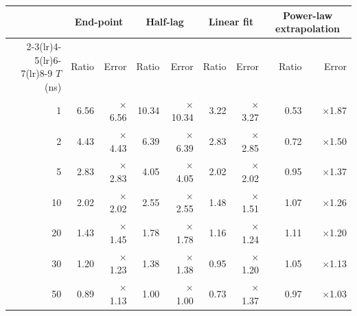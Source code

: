 \begin{tabular}{rrrrrrrrr}
\toprule
 & \multicolumn{2}{c}{End-point} & \multicolumn{2}{c}{Half-lag} & \multicolumn{2}{c}{Linear fit} & \multicolumn{2}{c}{Power-law extrapolation} \\
\cmidrule(lr){2-3}\cmidrule(lr){4-5}\cmidrule(lr){6-7}\cmidrule(lr){8-9}
$T$ (ns) & Ratio & Error & Ratio & Error & Ratio & Error & Ratio & Error \\
\midrule
1 & 6.56 & $\times$6.56 & 10.34 & $\times$10.34 & 3.22 & $\times$3.27 & 0.53 & $\times$1.87 \\
2 & 4.43 & $\times$4.43 & 6.39 & $\times$6.39 & 2.83 & $\times$2.85 & 0.72 & $\times$1.50 \\
5 & 2.83 & $\times$2.83 & 4.05 & $\times$4.05 & 2.02 & $\times$2.02 & 0.95 & $\times$1.37 \\
10 & 2.02 & $\times$2.02 & 2.55 & $\times$2.55 & 1.48 & $\times$1.51 & 1.07 & $\times$1.26 \\
20 & 1.43 & $\times$1.45 & 1.78 & $\times$1.78 & 1.16 & $\times$1.24 & 1.11 & $\times$1.20 \\
30 & 1.20 & $\times$1.23 & 1.38 & $\times$1.38 & 0.95 & $\times$1.20 & 1.05 & $\times$1.13 \\
50 & 0.89 & $\times$1.13 & 1.00 & $\times$1.00 & 0.73 & $\times$1.37 & 0.97 & $\times$1.03 \\
\bottomrule
\end{tabular}
